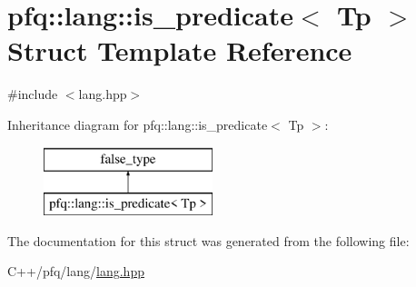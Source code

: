 \hypertarget{structpfq_1_1lang_1_1is__predicate}{}\section{pfq\+:\+:lang\+:\+:is\+\_\+predicate$<$ Tp $>$ Struct Template Reference}
\label{structpfq_1_1lang_1_1is__predicate}


{\ttfamily \#include $<$lang.\+hpp$>$}

Inheritance diagram for pfq\+:\+:lang\+:\+:is\+\_\+predicate$<$ Tp $>$\+:\begin{figure}[H]
\begin{center}
\leavevmode
\includegraphics[height=2.000000cm]{structpfq_1_1lang_1_1is__predicate}
\end{center}
\end{figure}


The documentation for this struct was generated from the following file\+:\begin{DoxyCompactItemize}
\item 
C++/pfq/lang/\hyperlink{lang_8hpp}{lang.\+hpp}\end{DoxyCompactItemize}
